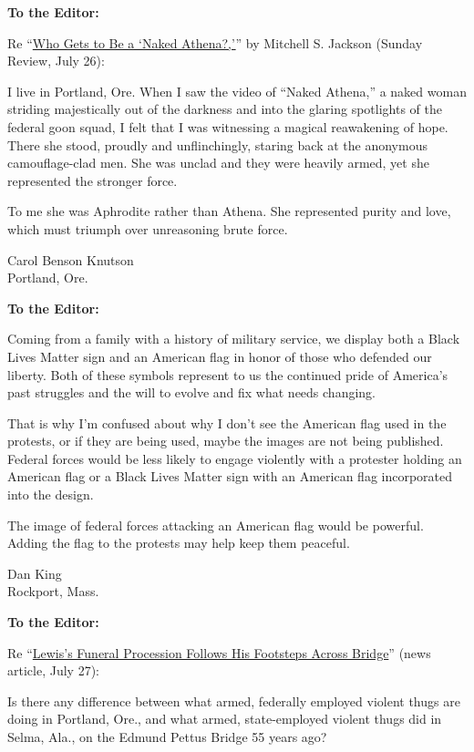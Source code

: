 \textbf{To the Editor:}

Re
``\href{https://www.nytimes3xbfgragh.onion/2020/07/25/opinion/sunday/portland-protests-white.html}{Who
Gets to Be a `Naked Athena?,'}'' by Mitchell S. Jackson (Sunday Review,
July 26):

I live in Portland, Ore. When I saw the video of ``Naked Athena,'' a
naked woman striding majestically out of the darkness and into the
glaring spotlights of the federal goon squad, I felt that I was
witnessing a magical reawakening of hope. There she stood, proudly and
unflinchingly, staring back at the anonymous camouflage-clad men. She
was unclad and they were heavily armed, yet she represented the stronger
force.

To me she was Aphrodite rather than Athena. She represented purity and
love, which must triumph over unreasoning brute force.

Carol Benson Knutson\\
Portland, Ore.

\textbf{To the Editor:}

Coming from a family with a history of military service, we display both
a Black Lives Matter sign and an American flag in honor of those who
defended our liberty. Both of these symbols represent to us the
continued pride of America's past struggles and the will to evolve and
fix what needs changing.

That is why I'm confused about why I don't see the American flag used in
the protests, or if they are being used, maybe the images are not being
published. Federal forces would be less likely to engage violently with
a protester holding an American flag or a Black Lives Matter sign with
an American flag incorporated into the design.

The image of federal forces attacking an American flag would be
powerful. Adding the flag to the protests may help keep them peaceful.

Dan King\\
Rockport, Mass.

\textbf{To the Editor:}

Re
``\href{https://www.nytimes3xbfgragh.onion/2020/07/26/us/selma-john-lewis-memorial.html}{Lewis's
Funeral Procession Follows His Footsteps Across Bridge}'' (news article,
July 27):

Is there any difference between what armed, federally employed violent
thugs are doing in Portland, Ore., and what armed, state-employed
violent thugs did in Selma, Ala., on the Edmund Pettus Bridge 55 years
ago?

